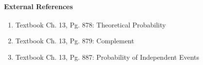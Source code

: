 \documentclass[letterpaper,12pt,twoside]{report}
\begin{document}
	\paragraph{External References}
	
	\begin{enumerate}
		\item Textbook Ch. 13, Pg. 878: Theoretical Probability
		\item Textbook Ch. 13, Pg. 879: Complement
		\item Textbook Ch. 13, Pg. 887: Probability of Independent Events
	\end{enumerate}
\end{document}
